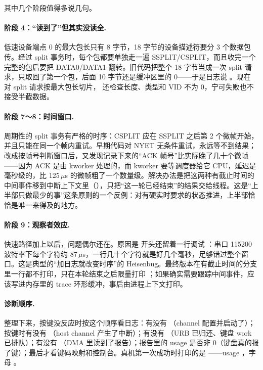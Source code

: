 其中几个阶段值得多说几句。

\paragraph{阶段 4：“读到了”但其实没读全.} 低速设备端点 0 的最大包长只有 8 字节，18 字节的设备描述符要分 3 个数据包传。经过 split 事务时，每个包都要单独走一遍 SSPLIT/CSPLIT，而且收完一个完整的包后要把 DATA0/DATA1 翻转。旧代码把整个 18 字节当成一次 split 请求，只取回了第一个包，后面 10 字节还是缓冲区里的 0——于是日志说 。现在  对 split 请求按最大包长切片， 还检查长度、类型和 VID 不为 0，宁可失败也不接受半截数据。

\paragraph{阶段 7～8：时间窗口.} 周期性的 split 事务有严格的时序：CSPLIT 应在 SSPLIT 之后第 2 个微帧开始，并且只能在同一个帧内重试。早期代码对 NYET 无条件重试，永远等不到结果；改成按帧号判断窗口后，又发现记录下来的“ACK 帧号”比实际晚了几十个微帧——因为 ACK 是由 kworker 处理的，而 kworker 要等调度器给它 CPU，延迟是毫秒级的，比 125\,$\mu$s 的微帧粗了一个数量级。解决办法是把这两种有截止时间的中间事件移到中断上下文里（），只把“这一轮已经结束”的结果交给线程。这是“上半部只做最少的事”这条原则的一个反例：对有硬实时要求的状态推进，上半部恰恰是唯一来得及的地方。

\paragraph{阶段 9：观察者效应.} 快速路径加上以后，问题偶尔还在。原因是  开头还留着一行调试 ：串口 115200 波特率下每个字符约 87\,$\mu$s，一行几十个字符就是好几个毫秒，足够错过整个窗口。这是典型的“加日志就改变时序”的 Heisenbug。最终版本在有截止时间的分支里一行都不打印，只在本轮结束之后限量打印 ；如果确实需要跟踪中间事件，应该写进内存里的 trace 环形缓冲，事后由进程上下文打印。

\paragraph{诊断顺序.} 整理下来，按键没反应时按这个顺序看日志：有没有 （channel 配置并启动了）；按键时有没有 （host channel 产生了中断）；有没有 （URB 已归还、键盘 work 已排队）；有没有 （DMA 里读到了报告）；报告里的 usage 是否非 0（键盘真的报了键）；最后才看键码映射和控制台。真机第一次成功时打印的是 ——usage ，字母 。

